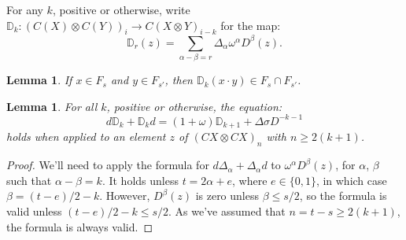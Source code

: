 \documentclass[11pt]{amsart}
\theoremstyle{plain}
\newtheorem{lem}[thm]{Lemma}
\theoremstyle{definition}
\renewcommand{\to}{\longrightarrow}
\theoremstyle{plain}
\newcommand{\twist}{\omega}
\begin{document}
\begin{External spectral sequence operations}
For any $k$, positive or otherwise, write $\mathbb{D}_k:(C(X)\otimes C(Y))_i\to C(X\otimes Y)_{i-k}$ for the map:
\[\mathbb{D}_r(z)= \sum_{\alpha-\beta=r}\Delta_\alpha\twist^\alpha D^\beta(z).
\]
\begin{lem}\label{DkIsNiceToFiltration}
If $x\in F_s$ and $y\in F_{s'}$, then $\mathbb{D}_k(x\cdot y)\in F_s\cap F_{s'}$.
\end{lem}
\begin{lem}\label{boundaryVsBBD}
For all $k$, positive or otherwise, the equation:
\[d\mathbb{D}_k+\mathbb{D}_kd= (1+\twist)\mathbb{D}_{k+1}+\Delta\sigma D^{-k-1}\]
holds when applied to an element $z$ of $(CX\otimes CX)_{n}$ with $n\geq 2(k+1)$.
\end{lem}
\begin{proof}
\newcommand{\twolinesum}[2]{\mathop{\sum_{\mathclap{#1}}}_{\mathclap{#2}}}
\newcommand{\onelinesum}[1]{\sum_{\mathclap{#1}}}
We'll need to apply the formula for $d\Delta_\alpha+\Delta_\alpha d$ to $\twist^\alpha D^\beta(z)$, for $\alpha$, $\beta$ such that $\alpha-\beta=k$. %
It holds unless $t=2\alpha+e$, where $e\in\{0,1\}$, in which case $\beta=(t-e)/2-k$. However, $D^\beta(z)$ is zero unless $\beta\leq s/2$, so the formula is valid unless $(t-e)/2-k\leq s/2$. As we've assumed that $n=t-s\geq2(k+1)$, the formula is always valid.


\end{proof}
\end{External spectral sequence operations}
\end{document}
